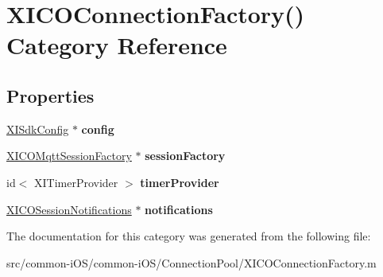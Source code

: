 \hypertarget{category_x_i_c_o_connection_factory_07_08}{}\section{X\+I\+C\+O\+Connection\+Factory() Category Reference}
\label{category_x_i_c_o_connection_factory_07_08}
\subsection*{Properties}
\begin{DoxyCompactItemize}
\item 
\hypertarget{category_x_i_c_o_connection_factory_07_08_ad568f7d7bbb5633da016a0dd0494d7bd}{}\label{category_x_i_c_o_connection_factory_07_08_ad568f7d7bbb5633da016a0dd0494d7bd} 
\hyperlink{class_x_i_sdk_config}{X\+I\+Sdk\+Config} $\ast$ {\bfseries config}
\item 
\hypertarget{category_x_i_c_o_connection_factory_07_08_a2fa3351a891ad1dcf618a357fe017c77}{}\label{category_x_i_c_o_connection_factory_07_08_a2fa3351a891ad1dcf618a357fe017c77} 
\hyperlink{interface_x_i_c_o_mqtt_session_factory}{X\+I\+C\+O\+Mqtt\+Session\+Factory} $\ast$ {\bfseries session\+Factory}
\item 
\hypertarget{category_x_i_c_o_connection_factory_07_08_a451d4be21229a73761bf3a1b97a9c9fd}{}\label{category_x_i_c_o_connection_factory_07_08_a451d4be21229a73761bf3a1b97a9c9fd} 
id$<$ X\+I\+Timer\+Provider $>$ {\bfseries timer\+Provider}
\item 
\hypertarget{category_x_i_c_o_connection_factory_07_08_a248d66403466f49e86461dd59ccce69e}{}\label{category_x_i_c_o_connection_factory_07_08_a248d66403466f49e86461dd59ccce69e} 
\hyperlink{interface_x_i_c_o_session_notifications}{X\+I\+C\+O\+Session\+Notifications} $\ast$ {\bfseries notifications}
\end{DoxyCompactItemize}


The documentation for this category was generated from the following file\+:\begin{DoxyCompactItemize}
\item 
src/common-\/i\+O\+S/common-\/i\+O\+S/\+Connection\+Pool/X\+I\+C\+O\+Connection\+Factory.\+m\end{DoxyCompactItemize}
